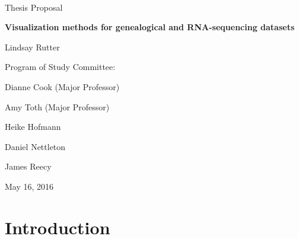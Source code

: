 \documentclass[11pt,a4paper,oldfontcommands,openany]{memoir}
\numberwithin{equation}{section} %
\begin{document}
\sloppy


{
\centering
~\vspace{\fill}

\vspace{2.5cm}

{\LARGE Thesis Proposal}

\vspace{1cm}

{\LARGE\textbf{Visualization methods for genealogical and RNA-sequencing datasets}}

\vspace{1cm}

{\LARGE Lindsay Rutter}

\vspace{4cm}

{\LARGE Program of Study Committee:}

\vspace{1cm}

{\LARGE Dianne Cook (Major Professor)}

\vspace{.25cm}

{\LARGE Amy Toth (Major Professor)}

\vspace{.25cm}

{\LARGE Heike Hofmann}

\vspace{.25cm}

{\LARGE Daniel Nettleton}

\vspace{.25cm}

{\LARGE James Reecy}

\vspace{2.5cm}

{\centerline{\large May 16, 2016}}
}

\clearpage

\setsecheadstyle{\Large\bfseries\sffamily\raggedright}
\setsubsecheadstyle{\large\bfseries\sffamily\raggedright}
\setsubsubsecheadstyle{\bfseries\sffamily\raggedright}

\tableofcontents

\setlength{\parskip}{10pt} %

\OnehalfSpacing

\chapter{Introduction}
\end{document}
